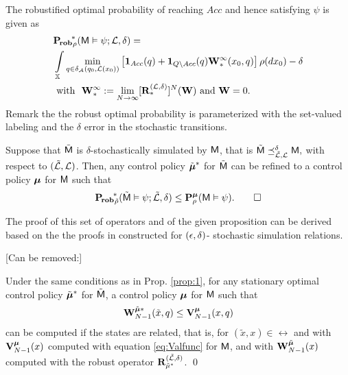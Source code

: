 \documentclass{ifacconf}
\newcommand{\red}[1]{{\color{red} #1}}
\begin{document}
The robustified optimal probability of reaching $Acc$ and hence satisfying $\psi$ is given as
\begin{align}\label{eq:prob:robust_optimal}
&\mathbf{P_{\! rob}}_\init^{\!\ast}(\MDP\vDash\psi; \Labset,\delta) =\\ & \int_{\X}\min_{\bar q \in \delta_\FSA(q_0,\Labset(x_0))}\left[\mathbf 1_{Acc}(\bar q)+ \mathbf 1_{Q \setminus Acc}(\bar q) \mathbf W^\infty_\ast(x_0,\bar q) \right]\notag 
\init (d x_0)-\delta\\
&\mbox{ with }\ \mathbf W^\infty_\ast :=  \lim_{N\rightarrow\infty}[\BelR_\ast^{(\Labset,\delta)}]^N (\mathbf W) \mbox{ and } \mathbf W=0.
\end{align} 
Remark the the robust optimal probability is parameterized with the set-valued labeling and the $\delta$ error in the stochastic transitions.


\begin{prop}\label{prop:1}
Suppose that $\tilde {\mathsf{M}}$  is  $\delta$-stochastically simulated by $\mathsf{M}$, that is  $\tilde{\mathsf{M}}\preceq^{\delta}_{\tilde{\mathcal{L}},\mathcal{L}}\mathsf{M},$ with respect to  $({\tilde{\mathcal{L}},\mathcal{L}})$. 
Then, any control policy ${\tilde {{\boldsymbol{\mu}}}}^*$ for $\tilde {\mathsf{M}}$ can be refined to a control policy   ${ {\boldsymbol{\mu}}}$ for $  \mathsf{M}$ such that 
 \begin{align}\label{eq:prob_result}
\mathbf{P_{\! rob}}_{\tilde \init}^{\!\ast}(\tilde \MDP\vDash\psi; \tilde\Labset,\delta)\leq  \mathbf P _{\init}^{\polb}(\MDP\vDash\psi).  \qed
\end{align}
 \end{prop}
The proof of this set of operators and of the given proposition can be derived based on the the proofs in \citep{tech_report_TACAS} constructed for $(\epsilon,\delta)$- stochastic simulation relations.


\red{[Can be removed:]}
\begin{cor}\label{cor:2} Under the same conditions as in Prop. \ref{prop:1}, for 
any stationary optimal control policy ${\tilde {{\boldsymbol{\mu}}}}^*$ for $\tilde {\mathsf{M}}$,  a control policy   ${ {\boldsymbol{\mu}}}$ for $  \mathsf{M}$ such that 
 \begin{align}
\mathbf W^{\tilde {{\boldsymbol{\mu}}}*}_{N-1} (\tilde x, q)\leq  \mathbf V^{\boldsymbol{\mu}}_{N-1} (x,q)
\end{align} can be computed if the states are related, that is,
for $(\tilde x, x ) \in \rel$ and with $\mathbf V^{\boldsymbol{\mu}}_{N-1} (x)$ computed with equation \eqref{eq:Valfunc} for $\mathsf{M}$, and  with $\mathbf W^{\tilde {{\boldsymbol{\mu}}}}_{N-1} (x)$ computed with the robust operator $\mathbf R^{(\tilde {\mathcal{L}}, \delta)}_{\tilde{{\mu}}^\ast}$.  \qed
 \end{cor}
\end{document}

